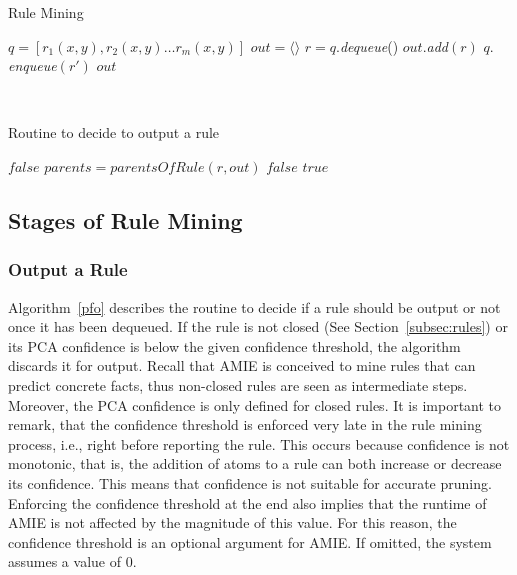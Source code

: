 {\begin{algorithm}
\caption{Rule Mining}
\label{rm}
\begin{algorithmic}[1]
    \State $q = [r_1(x,y), r_2(x,y) \dots r_m(x,y)] $
    \State $out = \langle \rangle$
	  \State $r = q.$\emph{dequeue}()
	      \State $out.$\emph{add}$(r)$
	    \EndIf
	  \EndIf
			\State $q.$\emph{enqueue}$(r')$
		      \EndIf
		    \EndIf
		  \EndFor
	    \EndFor
	  \EndIf  
	\EndWhile
    \State \Return $out$
\EndFunction
\end{algorithmic}
\end{algorithm}
\ \\[-1cm]
\begin{algorithm}
\caption{Routine to decide to output a rule}
\label{pfo}
\begin{algorithmic}[1]
      \State \Return $false$
    \EndIf 
    \State $parents = parentsOfRule(r, out)$
	\State \Return $false$
      \EndIf
    \EndFor
    \State \Return $true$
\EndFunction
\end{algorithmic}
\end{algorithm}

\subsection{Stages of Rule Mining}
\subsubsection{Output a Rule}  
\label{subsubsec:whenToOutput}
Algorithm~\ref{pfo} describes the routine to decide if a rule should be output or 
not once it has been dequeued. If the rule is not closed (See Section~\ref{subsec:rules}) or 
its PCA confidence is below the given confidence threshold, the algorithm discards it for output. 
Recall that AMIE is conceived to mine rules that can predict concrete facts, thus non-closed rules are
seen as intermediate steps. Moreover, the PCA confidence is only defined for closed rules.
It is important to remark, that the confidence threshold is enforced 
very late in the rule mining process, i.e., right before reporting the rule. 
This occurs because confidence is not monotonic, that is, the addition of atoms to a rule
can both increase or decrease its confidence. This means that confidence is not suitable for accurate
pruning. Enforcing the confidence threshold at the end also implies that
the runtime of AMIE is not affected by the magnitude of this value. For this reason, 
the confidence threshold is an optional argument for AMIE. If omitted, the system assumes a value of 0. 

}
